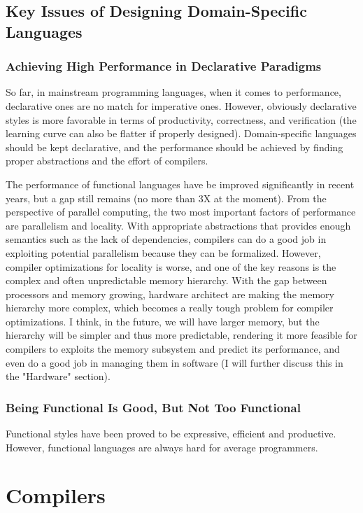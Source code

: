 \documentclass[11pt]{article}
\begin{document}
\subsection{Key Issues of Designing Domain-Specific Languages}
\subsubsection*{Achieving High Performance in Declarative Paradigms}
So far, in mainstream programming languages, when it comes to performance, declarative ones are no match for imperative ones.
However, obviously declarative styles is more favorable in terms of productivity, correctness, and verification (the learning curve can also be flatter if properly designed).
Domain-specific languages should be kept declarative, and the performance should be achieved by finding proper abstractions and the effort of compilers.

The performance of functional languages have be improved significantly in recent years, but a gap still remains (no more than 3X at the moment).
From the perspective of parallel computing, the two most important factors of performance are parallelism and locality.
With appropriate abstractions that provides enough semantics such as the lack of dependencies, compilers can do a good job in exploiting potential parallelism because they can be formalized.
However, compiler optimizations for locality is worse, and one of the key reasons is the complex and often unpredictable memory hierarchy.
With the gap between processors and memory growing, hardware architect are making the memory hierarchy more complex, which becomes a really tough problem for compiler optimizations.
I think, in the future, we will have larger memory, but the hierarchy will be simpler and thus more predictable, rendering it more feasible for compilers to exploits the memory subsystem and predict its performance, and even do a good job in managing them in software (I will further discuss this in the "Hardware" section).

\subsubsection*{Being Functional Is Good, But Not Too Functional}
Functional styles have been proved to be expressive, efficient and productive.
However, functional languages are always hard for average programmers.
\section{Compilers}
\end{document}
